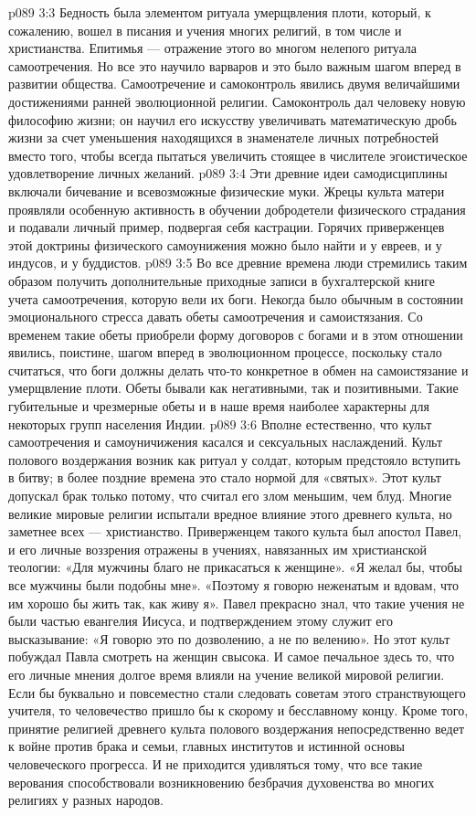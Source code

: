 \vs p089 3:3 Бедность была элементом ритуала умерщвления плоти, который, к сожалению, вошел в писания и учения многих религий, в том числе и христианства. Епитимья --- отражение этого во многом нелепого ритуала самоотречения. Но все это научило варваров  и это было важным шагом вперед в развитии общества. Самоотречение и самоконтроль явились двумя величайшими достижениями ранней эволюционной религии. Самоконтроль дал человеку новую философию жизни; он научил его искусству увеличивать математическую дробь жизни за счет уменьшения находящихся в знаменателе личных потребностей вместо того, чтобы всегда пытаться увеличить стоящее в числителе эгоистическое удовлетворение личных желаний.
\vs p089 3:4 Эти древние идеи самодисциплины включали бичевание и всевозможные физические муки. Жрецы культа матери проявляли особенную активность в обучении добродетели физического страдания и подавали личный пример, подвергая себя кастрации. Горячих приверженцев этой доктрины физического самоунижения можно было найти и у евреев, и у индусов, и у буддистов.
\vs p089 3:5 Во все древние времена люди стремились таким образом получить дополнительные приходные записи в бухгалтерской книге учета самоотречения, которую вели их боги. Некогда было обычным в состоянии эмоционального стресса давать обеты самоотречения и самоистязания. Со временем такие обеты приобрели форму договоров с богами и в этом отношении явились, поистине, шагом вперед в эволюционном процессе, поскольку стало считаться, что боги должны делать что\hyp{}то конкретное в обмен на самоистязание и умерщвление плоти. Обеты бывали как негативными, так и позитивными. Такие губительные и чрезмерные обеты и в наше время наиболее характерны для некоторых групп населения Индии.
\vs p089 3:6 \pc Вполне естественно, что культ самоотречения и самоуничижения касался и сексуальных наслаждений. Культ полового воздержания возник как ритуал у солдат, которым предстояло вступить в битву; в более поздние времена это стало нормой для «святых». Этот культ допускал брак только потому, что считал его злом меньшим, чем блуд. Многие великие мировые религии испытали вредное влияние этого древнего культа, но заметнее всех --- христианство. Приверженцем такого культа был апостол Павел, и его личные воззрения отражены в учениях, навязанных им христианской теологии: «Для мужчины благо не прикасаться к женщине». «Я желал бы, чтобы все мужчины были подобны мне». «Поэтому я говорю неженатым и вдовам, что им хорошо бы жить так, как живу я». Павел прекрасно знал, что такие учения не были частью евангелия Иисуса, и подтверждением этому служит его высказывание: «Я говорю это по дозволению, а не по велению». Но этот культ побуждал Павла смотреть на женщин свысока. И самое печальное здесь то, что его личные мнения долгое время влияли на учение великой мировой религии. Если бы буквально и повсеместно стали следовать советам этого странствующего учителя, то человечество пришло бы к скорому и бесславному концу. Кроме того, принятие религией древнего культа полового воздержания непосредственно ведет к войне против брака и семьи, главных институтов и истинной основы человеческого прогресса. И не приходится удивляться тому, что все такие верования способствовали возникновению безбрачия духовенства во многих религиях у разных народов.
